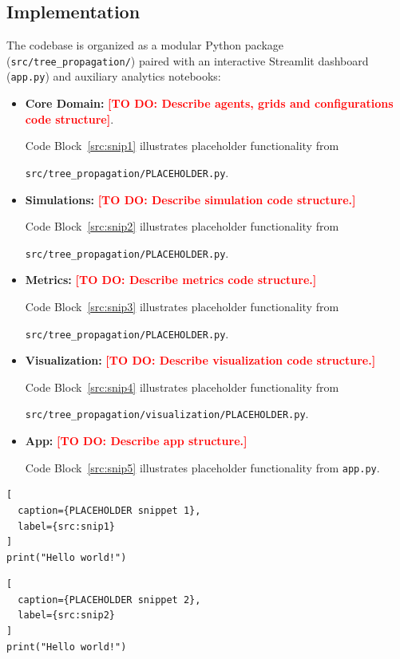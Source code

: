 \documentclass[a4paper,11pt]{scrartcl}
\DeclareRobustCommand{\todo}[1]{\textcolor{red}{\textbf{[TO DO: #1]}}}
\begin{document}
\FloatBarrier
\subsection{Implementation}
\label{sec:implementation}

The codebase is organized as a modular Python package (\texttt{src/tree\_propagation/}) paired with an interactive Streamlit dashboard (\texttt{app.py}) and auxiliary analytics notebooks:
\begin{itemize}
    \item \textbf{Core Domain:} \todo{Describe agents, grids and configurations code structure}. 
    
    Code Block~\ref{src:snip1} illustrates placeholder functionality from 

    \texttt{src/tree\_propagation/PLACEHOLDER.py}.
    \item \textbf{Simulations:} \todo{Describe simulation code structure.}
    
    Code Block~\ref{src:snip2} illustrates placeholder functionality from 

    \texttt{src/tree\_propagation/PLACEHOLDER.py}.
    \item \textbf{Metrics:} \todo{Describe metrics code structure.}
    
    Code Block~\ref{src:snip3} illustrates placeholder functionality from 

    \texttt{src/tree\_propagation/PLACEHOLDER.py}.
    \item \textbf{Visualization:} \todo{Describe visualization code structure.}
    
    Code Block~\ref{src:snip4} illustrates placeholder functionality from 

    \texttt{src/tree\_propagation/visualization/PLACEHOLDER.py}.
    \item \textbf{App:} \todo{Describe app structure.}

    Code Block~\ref{src:snip5} illustrates placeholder functionality from 
    \texttt{app.py}.
\end{itemize}

\begin{lstlisting}[
  caption={PLACEHOLDER snippet 1},
  label={src:snip1}
]
print("Hello world!")
\end{lstlisting}

\begin{lstlisting}[
  caption={PLACEHOLDER snippet 2},
  label={src:snip2}
]
print("Hello world!")
\end{lstlisting}
\end{document}
